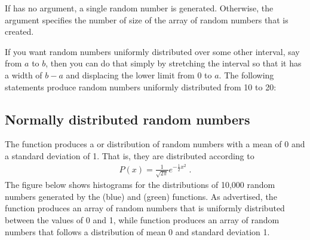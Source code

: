 \documentclass[letterpaper,10pt,english]{sphinxmanual}
\begin{document}
\sphinxAtStartPar
If  has no argument, a single random number is generated.  Otherwise, the argument specifies the number of size of the array of random numbers that is created.

\sphinxAtStartPar
If you want random numbers uniformly distributed over some other interval, say from \(a\) to \(b\), then you can do that simply by stretching the interval so that it has a width of \(b-a\) and displacing the lower limit from 0 to \(a\).  The following statements produce random numbers uniformly distributed from 10 to 20:

\begin{sphinxVerbatim}[commandchars=\\\{\},numbers=left,firstnumber=1,stepnumber=1]
    

  
\PYG{p}{[}   
\PYG{g+go}{                19.61360422, 19.21058726])}
\end{sphinxVerbatim}


\subsection{Normally distributed random numbers}
\label{\detokenize{chap3/chap3_arrays:normally-distributed-random-numbers}}
\sphinxAtStartPar
The function  produces a  or  distribution of  random numbers with a mean of 0 and a standard deviation of 1.  That is, they are distributed according to
\begin{equation*}
\begin{split}P(x) = \frac{1}{\sqrt{2\pi}} e^{-\frac{1}{2}x^2} \;.\end{split}
\end{equation*}
\sphinxAtStartPar
The figure below shows histograms for the distributions of 10,000 random numbers generated by the  (blue) and  (green) functions.  As advertised, the  function produces an array of random numbers that is uniformly distributed between the values of 0 and 1, while  function produces an array of random numbers that follows a distribution of mean 0 and standard deviation 1.
\end{document}
